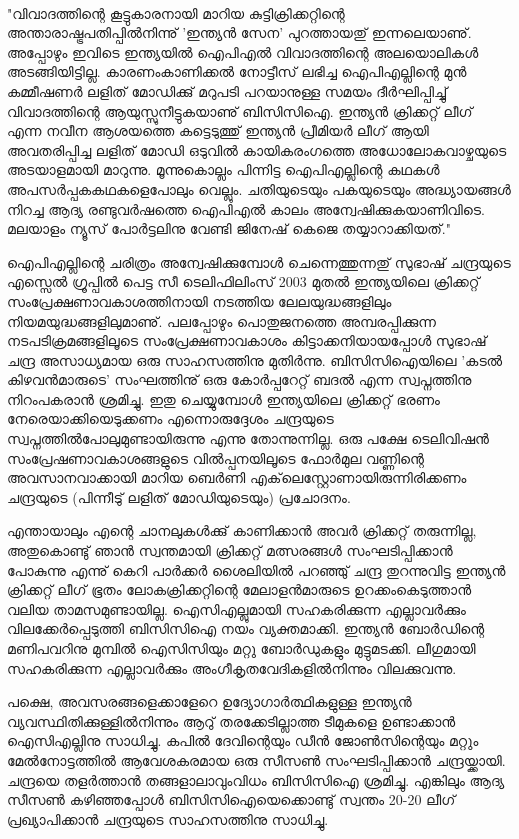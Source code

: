 ﻿
\enlargethispage{2\baselineskip}

‌\begin{framed}
"വിവാദത്തിന്റെ കൂട്ടുകാരനായി മാറിയ കുട്ടിക്രിക്കറ്റിന്റെ അന്താരാഷ്ട്രപതിപ്പില്‍നിന്നു് 'ഇന്ത്യന്‍ സേന' പുറത്തായതു് 
ഇന്നലെയാണു്. അപ്പോഴും ഇവിടെ ഇന്ത്യയില്‍ ഐപിഎല്‍ വിവാദത്തിന്റെ അലയൊലികള്‍ അടങ്ങിയിട്ടില്ല. 
കാരണംകാണിക്കല്‍ നോട്ടീസ് ലഭിച്ച ഐപിഎല്ലിന്റെ മുന്‍ കമ്മീഷണര്‍ ലളിത് മോഡിക്കു് മറുപടി പറയാനുള്ള 
സമയം ദീര്‍ഘിപ്പിച്ചു് വിവാദത്തിന്റെ ആയുസ്സുനീട്ടുകയാണു് ബിസിസിഐ. ഇന്ത്യന്‍ ക്രിക്കറ്റ് ലീഗ് എന്ന നവീന 
ആശയത്തെ കട്ടെടുത്തു് ഇന്ത്യന്‍ പ്രീമിയര്‍ ലീഗ് ആയി അവതരിപ്പിച്ച ലളിത് മോഡി ഒടുവില്‍ കായികരംഗത്തെ 
അധോലോകവാഴ്ചയുടെ അടയാളമായി മാറുന്നു. മൂന്നുകൊല്ലം പിന്നിട്ട ഐപിഎല്ലിന്റെ കഥകള്‍ 
അപസര്‍പ്പകകഥകളെപോലും വെല്ലും. ചതിയുടെയും പകയുടെയും അദ്ധ്യായങ്ങള്‍ നിറച്ച ആദ്യ രണ്ടുവര്‍ഷത്തെ ഐപിഎല്‍ കാലം 
അന്വേഷിക്കുകയാണിവിടെ.  മലയാളം ന്യൂസ് പോര്‍ട്ടലിനു വേണ്ടി ജിനേഷ് കെജെ തയ്യാറാക്കിയത്."
\end{framed}


ഐപിഎല്ലിന്റെ ചരിത്രം അന്വേഷിക്കുമ്പോള്‍ ചെന്നെത്തുന്നതു് സുഭാഷ് ചന്ദ്രയുടെ എസ്സെല്‍ ഗ്രൂപ്പില്‍ പെട്ട സീ ടെലിഫിലിംസ് 
2003 മുതല്‍ ഇന്ത്യയിലെ ക്രിക്കറ്റ് സംപ്രേക്ഷണാവകാശത്തിനായി നടത്തിയ ലേലയുദ്ധങ്ങളിലും നിയമയുദ്ധങ്ങളിലുമാണു്. 
പലപ്പോഴും പൊതുജനത്തെ അമ്പരപ്പിക്കുന്ന നടപടിക്രമങ്ങളിലൂടെ സംപ്രേക്ഷണാവകാശം കിട്ടാക്കനിയായപ്പോള്‍ 
സുഭാഷ് ചന്ദ്ര അസാധ്യമായ ഒരു സാഹസത്തിനു മുതിര്‍ന്നു. ബിസിസിഐയിലെ 'കടല്‍ കിഴവന്‍മാരുടെ' സംഘത്തിനു് 
ഒരു കോര്‍പ്പറേറ്റ് ബദല്‍ എന്ന സ്വപ്നത്തിനു നിറംപകരാന്‍ ശ്രമിച്ചു. ഇതു ചെയ്യുമ്പോള്‍ ഇന്ത്യയിലെ ക്രിക്കറ്റ് ഭരണം 
നേരെയാക്കിയെടുക്കണം എന്നൊരുദ്ദേശം ചന്ദ്രയുടെ സ്വപ്നത്തില്‍പോലുമുണ്ടായിരുന്നു എന്നു തോന്നുന്നില്ല. ഒരു പക്ഷേ 
ടെലിവിഷന്‍ സംപ്രേഷണാവകാശങ്ങളുടെ വില്‍പ്പനയിലൂടെ ഫോര്‍മുല വണ്ണിന്റെ അവസാനവാക്കായി മാറിയ ബെര്‍ണി 
എക്‌ലെസ്റ്റോണായിരുന്നിരിക്കണം ചന്ദ്രയുടെ (പിന്നീടു് ലളിത് മോഡിയുടെയും) പ്രചോദനം.

എന്തായാലും എന്റെ ചാനലുകള്‍ക്കു് കാണിക്കാന്‍ അവര്‍ ക്രിക്കറ്റ് തരുന്നില്ല, അതുകൊണ്ടു് ഞാന്‍ സ്വന്തമായി 
ക്രിക്കറ്റ് മത്സരങ്ങള്‍ സംഘടിപ്പിക്കാന്‍ പോകുന്നു എന്നു് കെറി പാര്‍ക്കര്‍ ശൈലിയില്‍ പറഞ്ഞു് ചന്ദ്ര തുറന്നുവിട്ട ഇന്ത്യന്‍ 
ക്രിക്കറ്റ് ലീഗ് ഭൂതം ലോകക്രിക്കറ്റിന്റെ മേലാളന്‍മാരുടെ ഉറക്കംകെടുത്താന്‍ വലിയ താമസമുണ്ടായില്ല. ഐസിഎല്ലുമായി 
സഹകരിക്കുന്ന എല്ലാവര്‍ക്കും വിലക്കേര്‍പ്പെടുത്തി ബിസിസിഐ നയം വ്യക്തമാക്കി. ഇന്ത്യന്‍ ബോര്‍ഡിന്റെ മണിപവറിനു 
മുമ്പില്‍ ഐസിസിയും മറ്റു ബോര്‍ഡുകളും മുട്ടുമടക്കി. ലീഗുമായി സഹകരിക്കുന്ന എല്ലാവര്‍ക്കും അംഗീകൃതവേദികളില്‍നിന്നും 
വിലക്കുവന്നു.

പക്ഷെ, അവസരങ്ങളെക്കാളേറെ ഉദ്യോഗാര്‍ത്ഥികളുള്ള ഇന്ത്യന്‍ വ്യവസ്ഥിതിക്കുള്ളില്‍നിന്നും ആറു് തരക്കേടില്ലാത്ത 
ടീമുകളെ ഉണ്ടാക്കാന്‍ ഐസിഎല്ലിനു സാധിച്ചു. കപില്‍ ദേവിന്റെയും ഡീന്‍ ജോണ്‍സിന്റെയും മറ്റും മേല്‍നോട്ടത്തില്‍ 
ആവേശകരമായ ഒരു സീസണ്‍ സംഘടിപ്പിക്കാന്‍ ചന്ദ്രയ്ക്കായി. ചന്ദ്രയെ തളര്‍ത്താന്‍ തങ്ങളാലാവുംവിധം ബിസിസിഐ 
ശ്രമിച്ചു. എങ്കിലും ആദ്യ സീസണ്‍ കഴിഞ്ഞപ്പോള്‍ ബിസിസിഐയെക്കൊണ്ടു് സ്വന്തം 20-20 ലീഗ് പ്രഖ്യാപിക്കാന്‍ ചന്ദ്രയുടെ 
സാഹസത്തിനു സാധിച്ചു.

